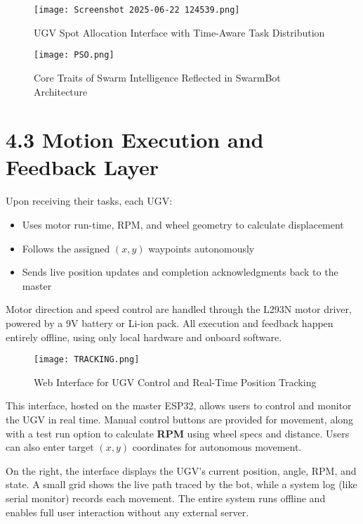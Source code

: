 \documentclass[a4paper,12pt]{report}
\begin{document}
\begin{figure}[H]
    \centering
    \texttt{[image: Screenshot 2025-06-22 124539.png]}
    \caption{UGV Spot Allocation Interface with Time-Aware Task Distribution}
\end{figure}

\begin{figure}[H]
    \centering
    \texttt{[image: PSO.png]}
    \caption{Core Traits of Swarm Intelligence Reflected in SwarmBot Architecture}
\end{figure}


\section{4.3 Motion Execution and Feedback Layer}

Upon receiving their tasks, each UGV:
\begin{itemize}
    \item Uses motor run-time, RPM, and wheel geometry to calculate displacement
    \item Follows the assigned $(x, y)$ waypoints autonomously
    \item Sends live position updates and completion acknowledgments back to the master
\end{itemize}

Motor direction and speed control are handled through the L293N motor driver, powered by a 9V battery or Li-ion pack.  
All execution and feedback happen entirely offline, using only local hardware and onboard software.

\begin{figure}[H]
    \centering
    \texttt{[image: TRACKING.png]}
    \caption{Web Interface for UGV Control and Real-Time Position Tracking}
\end{figure}

This interface, hosted on the master ESP32, allows users to control and monitor the UGV in real time.  
Manual control buttons are provided for movement, along with a test run option to calculate \textbf{RPM} using wheel specs and distance.  
Users can also enter target $(x, y)$ coordinates for autonomous movement.

On the right, the interface displays the UGV’s current position, angle, RPM, and state.  
A small grid shows the live path traced by the bot, while a system log (like serial monitor) records each movement.  
The entire system runs offline and enables full user interaction without any external server.
\end{document}
